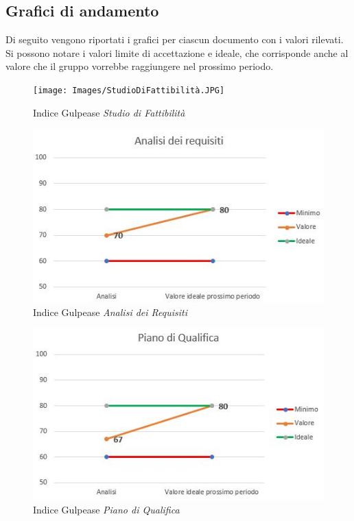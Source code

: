 \subsection{Grafici di andamento}
Di seguito vengono riportati i grafici per ciascun documento con i valori rilevati. Si possono notare i valori limite di accettazione e ideale, che corrisponde anche al valore che il gruppo vorrebbe raggiungere nel prossimo periodo.

\begin{figure}[h]
	\centering
	\texttt{[image: Images/StudioDiFattibilità.JPG]}
	\caption{Indice Gulpease \textit{Studio di Fattibilità}}
\end{figure}

\begin{figure}
	\centering
	\includegraphics[scale=1]{Images/AnalisiDeiRequisiti.JPG}
	\caption{Indice Gulpease \textit{Analisi dei Requisiti}}
\end{figure}

\begin{figure}
	\centering
	\includegraphics[scale=1]{Images/PianoDiQualifica.JPG}
	\caption{Indice Gulpease \textit{Piano di Qualifica}}
\end{figure}

